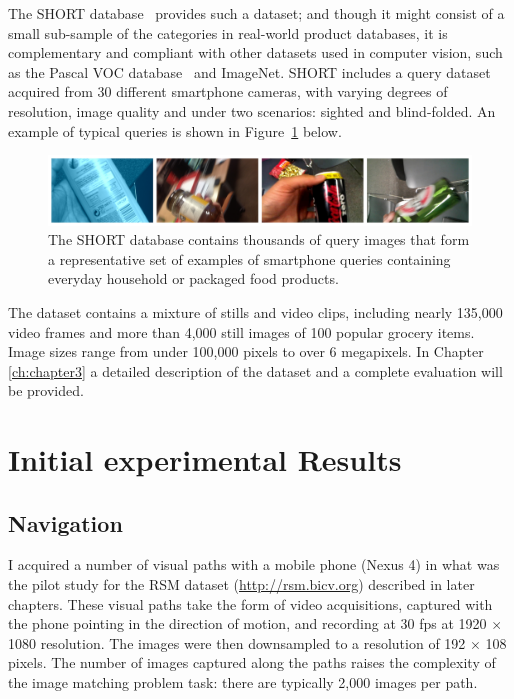The SHORT database~\cite{Rivera-Rubio2013a} provides such a dataset; and though it might consist of a small sub-sample of the categories in real-world product databases, it is  complementary and compliant with other datasets used in computer vision, such as the Pascal VOC database~\cite{Everingham2009} and ImageNet.  SHORT includes a query dataset acquired from 30 different smartphone cameras, with varying degrees of resolution, image quality and under two scenarios: sighted and blind-folded.  An example of typical queries is shown in Figure~\ref{fig:ShortQueries} below.

\begin{figure}
\centering
\includegraphics[width=\textwidth]{./gfx/Chapter02/TestDatasetCollage4imgs.jpg}
\caption{The SHORT database contains thousands of query images that form a representative set of examples of smartphone queries containing everyday household or packaged food products.}
\label{fig:ShortQueries}
\end{figure}

The dataset contains a mixture of stills and video clips, including nearly 135,000 video frames and more than 4,000 still images of 100 popular grocery items.  Image sizes range from under 100,000 pixels to over 6 megapixels. In Chapter \ref{ch:chapter3} a detailed description of the dataset and a complete evaluation will be provided.



\section{Initial experimental Results} \label{sec:expResults}

\subsection{Navigation}

I acquired a number of visual paths with a mobile phone (Nexus 4) in what was the pilot study for the RSM dataset (\url{http://rsm.bicv.org}) described in later chapters.  These visual paths take the form of video acquisitions, captured with the phone pointing in the direction of motion, and recording at 30 fps at 1920 $\times$ 1080 resolution. The images were then downsampled to a resolution of 192 $\times$ 108 pixels. The number of images captured along the paths raises the complexity of the image matching problem task: there are typically 2,000 images per path.

